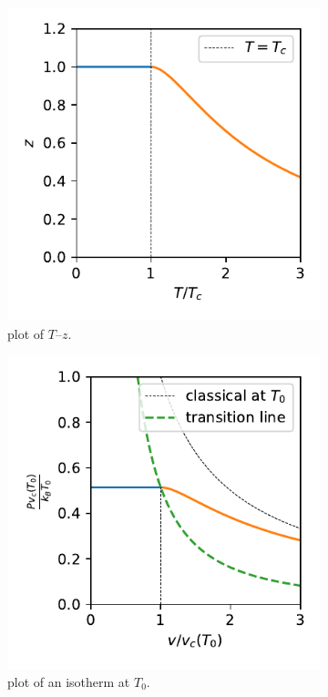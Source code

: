 \begin{itemize}
	\begin{figure}[H]
		\centering
		\begin{subfigure}{0.4\linewidth}
			\centering
			\includegraphics[scale=0.8]{figures/plot of T--z.pdf}
			\caption{plot of $T$--$z$.}
			\label{figure 7.2 (a)}
		\end{subfigure}
		\begin{subfigure}{0.4\linewidth}
			\centering
			\includegraphics[scale=0.8]{figures/plot of an isotherm at T_0.pdf}
			\caption{plot of an isotherm at $T_0$.}
			\label{figure 7.2 (b)}
		\end{subfigure}
		\caption{}
	\end{figure}
\end{itemize}


